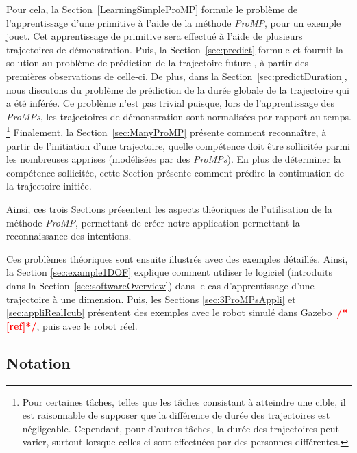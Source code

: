 \documentclass[utf8]{frontiersSCNS} %
\newcommand{\toimprove}[1]{\textcolor{teal}{#1}}
\newcommand{\todo}[1]{\textcolor{red}{\textbf{/*#1*/}}}
\begin{document}
Pour cela, la Section~\ref{LearningSimpleProMP} formule le problème de l'apprentissage d'une primitive à l'aide de la méthode \textit{ProMP}, pour un exemple jouet. Cet apprentissage de primitive sera effectué à l'aide de plusieurs trajectoires de démonstration. 
Puis, la Section~\ref{sec:predict} formule et fournit la solution au problème de prédiction de la trajectoire \og future \fg{}, à partir des premières observations de celle-ci.
De plus, dans la Section~\ref{sec:predictDuration}, nous discutons du problème de prédiction de la 
durée globale de la trajectoire qui a été inférée. Ce problème n'est pas trivial puisque, lors de l'apprentissage des \textit{ProMPs}, les trajectoires de démonstration sont \og normalisées \fg{} par rapport au temps. \footnote{Pour certaines tâches, telles que les tâches consistant à atteindre une cible, il est raisonnable de supposer que la différence de durée des trajectoires est négligeable. Cependant, pour d'autres tâches, la durée des trajectoires peut varier, surtout lorsque celles-ci sont effectuées par des personnes différentes.}
Finalement, la Section~\ref{sec:ManyProMP} présente comment reconnaître, à partir de l'initiation d'une trajectoire, quelle compétence doit être sollicitée parmi les nombreuses apprises (modélisées par des \textit{ProMPs}). En plus de déterminer la compétence sollicitée, cette Section présente comment prédire la continuation de la trajectoire initiée.

Ainsi, ces trois Sections présentent les aspects théoriques de l'utilisation de la méthode \textit{ProMP}, permettant de créer notre application permettant la reconnaissance des intentions.

Ces problèmes théoriques sont ensuite illustrés avec des exemples détaillés.
Ainsi, la Section \ref{sec:example1DOF} explique comment utiliser le logiciel (introduits dans la Section~\ref{sec:softwareOverview}) dans le cas d'apprentissage d'une trajectoire à une dimension.
Puis, les Sections \ref{sec:3ProMPsAppli} et \ref{sec:appliRealIcub} présentent des exemples avec le robot simulé dans Gazebo~\todo{[ref]}, puis avec le robot réel.


\subsection{Notation}\label{sec:notation}
\end{document}
